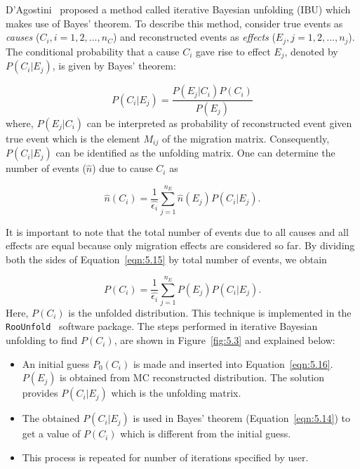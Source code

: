 D'Agostini~\cite{DAGOSTINI1995487} proposed a method called iterative Bayesian unfolding (IBU) 
which makes use of Bayes' theorem. To describe this method, consider true events as 
\textit{causes} ($C_i, i=1,2,...,n_C$) and reconstructed events as 
\textit{effects} ($E_j, j=1,2,...,n_j$). The conditional probability that a cause $C_i$ gave 
rise to effect $E_j$, denoted by $P(C_i|E_j)$, is given by Bayes' theorem:

\begin{equation}
    P(C_i|E_j) = \frac{P(E_j|C_i)P(C_i)}{P(E_j)} 
    \label{eqn:5.14}
\end{equation}
where, $P(E_j|C_i)$ can be interpreted as probability of reconstructed event given true 
event which is the element $M_{ij}$ of the migration matrix. Consequently, $P(C_i|E_j)$ can 
be identified as the unfolding matrix. One can determine the number of events ($\hat{n}$) 
due to cause $C_i$ as

\begin{equation}
    \hat{n}(C_i) = \frac{1}{\hat{\epsilon_i}}\sum_{j=1}^{n_E} \hat{n}(E_j) P(C_i|E_j).
    \label{eqn:5.15}
\end{equation}

It is important to note that the total number of events due to all causes and all 
effects are equal because only migration effects are considered so far. By dividing both 
the sides of Equation~\ref{eqn:5.15} by total number of events, we obtain

\begin{equation}
     P(C_i) = \frac{1}{\hat{\epsilon_i}}\sum_{j=1}^{n_E}P(E_j) P(C_i|E_j).
     \label{eqn:5.16}
\end{equation}
Here, $P(C_i)$ is the unfolded distribution. This technique is implemented in the 
\texttt{RooUnfold}~\cite{roounfold} software package. The steps performed in iterative Bayesian 
unfolding to find $P(C_i)$, are shown in Figure~\ref{fig:5.3} and explained below:
\begin{itemize}
    \item An initial guess $P_0(C_i)$ is made and inserted into Equation~\ref{eqn:5.16}. $P(E_j)$ is obtained from MC reconstructed distribution. The solution provides $P(C_i|E_j)$ which is the unfolding matrix.
    \item The obtained $P(C_i|E_j)$ is used in Bayes' theorem (Equation~\ref{eqn:5.14}) to get a value of $P(C_i)$ which is different from the initial guess.
    \item This process is repeated for number of iterations specified by user. 
\end{itemize}


